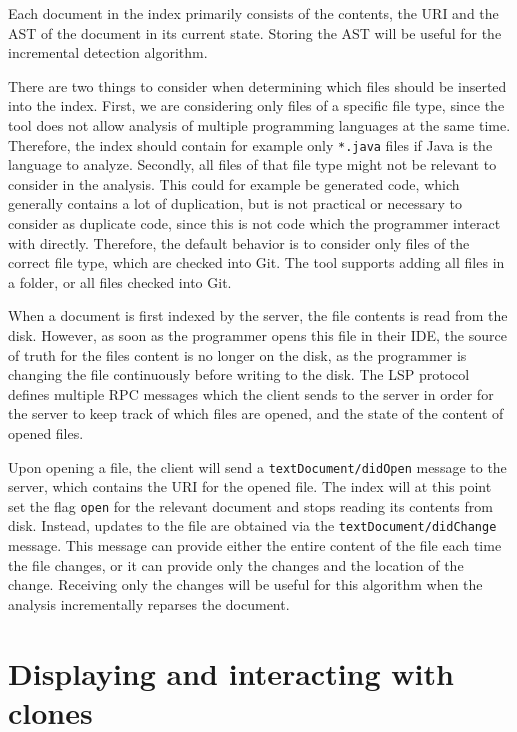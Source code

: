 Each document in the index primarily consists of the contents, the URI and the AST of the
document in its current state. Storing the AST will be useful for the incremental
detection algorithm.

There are two things to consider when determining which files should be inserted into the
index. First, we are considering only files of a specific file type, since the tool does
not allow analysis of multiple programming languages at the same time. Therefore, the
index should contain for example only \verb|*.java| files if Java is the language to
analyze. Secondly, all files of that file type might not be relevant to consider in the
analysis. This could for example be generated code, which generally contains a lot of
duplication, but is not practical or necessary to consider as duplicate code, since this
is not code which the programmer interact with directly. Therefore, the default behavior
is to consider only files of the correct file type, which are checked into Git. The tool
supports adding all files in a folder, or all files checked into Git.

When a document is first indexed by the server, the file contents is read from the disk.
However, as soon as the programmer opens this file in their IDE, the source of truth for
the files content is no longer on the disk, as the programmer is changing the file
continuously before writing to the disk. The LSP protocol defines multiple RPC
messages which the client sends to the server in order for the server to keep track of
which files are opened, and the state of the content of opened files.

Upon opening a file, the client will send a \verb|textDocument/didOpen| message to the
server, which contains the URI for the opened file. The index will at this point set the
flag \verb|open| for the relevant document and stops reading its contents from disk.
Instead, updates to the file are obtained via the \verb|textDocument/didChange| message.
This message can provide either the entire content of the file each time the file changes,
or it can provide only the changes and the location of the change. Receiving only the
changes will be useful for this algorithm when the analysis incrementally reparses the
document.

\section{Displaying and interacting with clones}

